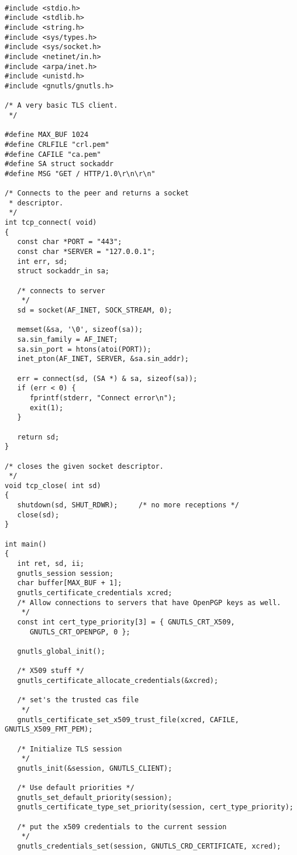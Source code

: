 \begin{verbatim}

#include <stdio.h>
#include <stdlib.h>
#include <string.h>
#include <sys/types.h>
#include <sys/socket.h>
#include <netinet/in.h>
#include <arpa/inet.h>
#include <unistd.h>
#include <gnutls/gnutls.h>

/* A very basic TLS client.
 */

#define MAX_BUF 1024
#define CRLFILE "crl.pem"
#define CAFILE "ca.pem"
#define SA struct sockaddr
#define MSG "GET / HTTP/1.0\r\n\r\n"

/* Connects to the peer and returns a socket
 * descriptor.
 */
int tcp_connect( void)
{
   const char *PORT = "443";
   const char *SERVER = "127.0.0.1";
   int err, sd;
   struct sockaddr_in sa;

   /* connects to server 
    */
   sd = socket(AF_INET, SOCK_STREAM, 0);

   memset(&sa, '\0', sizeof(sa));
   sa.sin_family = AF_INET;
   sa.sin_port = htons(atoi(PORT));
   inet_pton(AF_INET, SERVER, &sa.sin_addr);

   err = connect(sd, (SA *) & sa, sizeof(sa));
   if (err < 0) {
      fprintf(stderr, "Connect error\n");
      exit(1);
   }

   return sd;
}

/* closes the given socket descriptor.
 */
void tcp_close( int sd) 
{
   shutdown(sd, SHUT_RDWR);     /* no more receptions */
   close(sd);
}

int main()
{
   int ret, sd, ii;
   gnutls_session session;
   char buffer[MAX_BUF + 1];
   gnutls_certificate_credentials xcred;
   /* Allow connections to servers that have OpenPGP keys as well.
    */
   const int cert_type_priority[3] = { GNUTLS_CRT_X509, 
      GNUTLS_CRT_OPENPGP, 0 };

   gnutls_global_init();

   /* X509 stuff */
   gnutls_certificate_allocate_credentials(&xcred);

   /* set's the trusted cas file
    */
   gnutls_certificate_set_x509_trust_file(xcred, CAFILE, GNUTLS_X509_FMT_PEM);

   /* Initialize TLS session 
    */
   gnutls_init(&session, GNUTLS_CLIENT);

   /* Use default priorities */
   gnutls_set_default_priority(session);
   gnutls_certificate_type_set_priority(session, cert_type_priority);

   /* put the x509 credentials to the current session
    */
   gnutls_credentials_set(session, GNUTLS_CRD_CERTIFICATE, xcred);


\end{verbatim}

